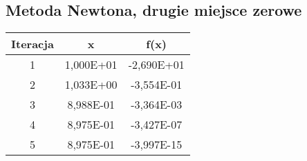 \documentclass[12pt]{article}
\begin{document}
\subsection{Metoda Newtona, drugie miejsce zerowe}
\begin{table}[!htbp]
\centering
\begin{longtable}{|c|c|c|} 
    \hline
    \textbf{Iteracja} & \textbf{x} & \textbf{f(x)} \\
    \hline\hline
    1 & 1,000E+01   &	-2,690E+01   \\ \hline
    2 & 1,033E+00   &	-3,554E-01   \\ \hline
    3 & 8,988E-01   &	-3,364E-03   \\ \hline
    4 & 8,975E-01   &	-3,427E-07   \\ \hline
    5 & 8,975E-01   &	-3,997E-15   \\ \hline
\end{longtable}
\label{table:samples4}
\end{table}
\FloatBarrier
\end{document}
